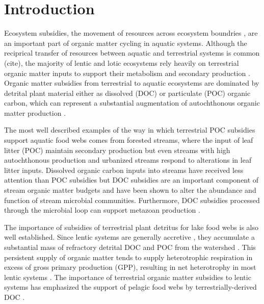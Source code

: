 \section{Introduction}
Ecosystem subsidies, the movement of resources across ecosystem boundries \cite{Polis_1997}, are an important part of organic matter cycling in aquatic systems. Although the reciprical transfer of resources between aquatic and terrestrial systems is common (cite), the majority of lentic and lotic ecosystems rely heavily on terrestrial organic matter inputs to support their metabolism and secondary production \cite{Marcarelli_2011}. Organic matter subsidies from terrestrial to aquatic ecosystems are dominated by detrital plant material either as dissolved (DOC) or particulate (POC) organic carbon, which can represent a substantial augmentation of autochthonous organic matter production \cite{Hodkinson_1975,GASITH_1976,wetzel_1984,WETZEL_1995,Webster_1997,Kobayashi_2011,Mehring_2014}.   

The most well described examples of the way in which terrestrial POC subsidies support aquatic food webs comes from forested streams, where the input of leaf litter (POC) maintain secondary production \cite{wallaceetal_1999}  but even streams with high autochthonous production \cite{Mineau_2012} and urbanized streams \cite{Duan_2014} respond to alterations in leaf litter inputs. Dissolved organic carbon inputs into streams have received less attention than POC subsidies but DOC subsidies are an important component of stream organic matter budgets \cite{McDowell_1976} and have been shown to alter the abundance \cite{Bott_1984} and function \cite{Bernhardt_2002} of stream microbial communities. Furthermore, DOC subsidies processed through the microbial loop can support metazoan production \cite{Hall_1998,Wilcox_2005}.

The importance of subsidies of terrestrial plant detritus for lake food webs is also well established. Since lentic systems are generally accretive \cite{WETZEL_2001}, they accumulate a substantial mass of refractory detrital DOC and POC from the watershed \cite{Rich_1978,wetzel_1984,WETZEL_1995}. This persistent supply of organic matter tends to supply heterotrophic respiration in excess of gross primary production (GPP), resulting in net heterotrophy in most lentic systems \cite{Cole_2000,Marcarelli_2011}. The importance of terrestrial organic matter subsidies to lentic systems has emphasized the support of pelagic food webs by terrestrially-derived DOC \cite{Carpenter_2005} \cite{Cole_2006} \cite{Pace_2004}.

